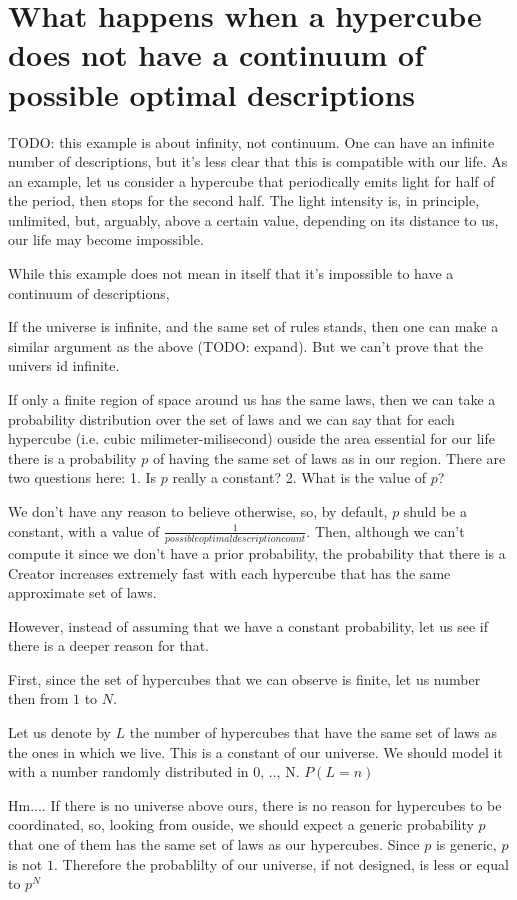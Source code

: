 \documentclass[a4paper
,draft
]{article}
\begin{document}
\section{What happens when a hypercube does not have a continuum of possible optimal descriptions}

TODO: this example is about infinity, not continuum. One can have an infinite number of descriptions, but it's less clear that this is compatible with our life. As an example, let us consider a hypercube that periodically emits light for half of the period, then stops for the second half. The light intensity is, in principle, unlimited, but, arguably, above a certain value, depending on its distance to us, our life may become impossible.

While this example does not mean in itself that it's impossible to have a continuum of descriptions,

If the universe is infinite, and the same set of rules stands, then one can make a similar argument as the above (TODO: expand). But we can't prove that the univers id infinite.

If only a finite region of space around us has the same laws, then we can take a probability distribution over the set of laws and we can say that for each hypercube (i.e. cubic milimeter-milisecond) ouside the area essential for our life there is a probability $p$ of having the same set of laws as in our region. There are two questions here: 1. Is $p$ really a constant? 2. What is the value of $p$?

We don't have any reason to believe otherwise, so, by default, $p$ shuld be a constant, with a value of $\frac{1}{possible optimal description count}$. Then, although we can't compute it since we don't have a prior probability, the probability that there is a Creator increases extremely fast with each hypercube that has the same approximate set of laws.

However, instead of assuming that we have a constant probability, let us see if there is a deeper reason for that.

First, since the set of hypercubes that we can observe is finite, let us number then from $1$ to $N$.

Let us denote by $L$ the number of hypercubes that have the same set of laws as the ones in which we live. This is a constant of our universe. We should model it with a number randomly distributed in {0, .., N}. $P(L=n)$

Hm.... If there is no universe above ours, there is no reason for hypercubes to be coordinated, so, looking from ouside, we should expect a generic probability $p$ that one of them has the same set of laws as our hypercubes. Since $p$ is generic, $p$ is not $1$. Therefore the probablilty of our universe, if not designed, is less or equal to $p^N$
\end{document}
